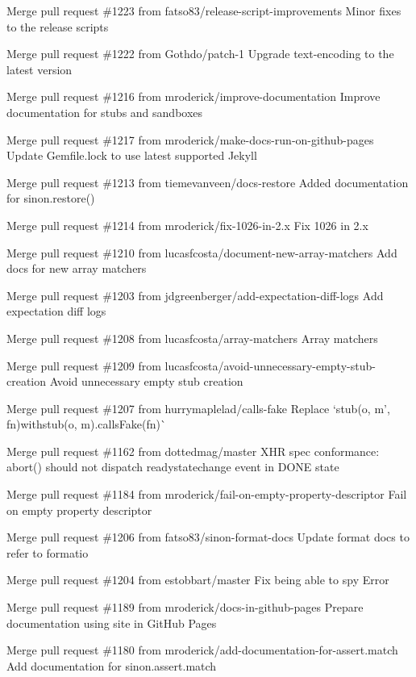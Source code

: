 \begin{DoxyItemize}
\item Merge pull request \#1223 from fatso83/release-\/script-\/improvements Minor fixes to the release scripts
\item Merge pull request \#1222 from Gothdo/patch-\/1 Upgrade text-\/encoding to the latest version
\item Merge pull request \#1216 from mroderick/improve-\/documentation Improve documentation for stubs and sandboxes
\item Merge pull request \#1217 from mroderick/make-\/docs-\/run-\/on-\/github-\/pages Update Gemfile.\+lock to use latest supported Jekyll
\item Merge pull request \#1213 from tiemevanveen/docs-\/restore Added documentation for sinon.\+restore()
\item Merge pull request \#1214 from mroderick/fix-\/1026-\/in-\/2.\+x Fix 1026 in 2.\+x
\item Merge pull request \#1210 from lucasfcosta/document-\/new-\/array-\/matchers Add docs for new array matchers
\item Merge pull request \#1203 from jdgreenberger/add-\/expectation-\/diff-\/logs Add expectation diff logs
\item Merge pull request \#1208 from lucasfcosta/array-\/matchers Array matchers
\item Merge pull request \#1209 from lucasfcosta/avoid-\/unnecessary-\/empty-\/stub-\/creation Avoid unnecessary empty stub creation
\item Merge pull request \#1207 from hurrymaplelad/calls-\/fake Replace `stub(o, \textquotesingle{}m', fn){\ttfamily with}stub(o, \textquotesingle{}m\textquotesingle{}).calls\+Fake(fn)\`{}
\item Merge pull request \#1162 from dottedmag/master X\+HR spec conformance\+: abort() should not dispatch readystatechange event in D\+O\+NE state
\item Merge pull request \#1184 from mroderick/fail-\/on-\/empty-\/property-\/descriptor Fail on empty property descriptor
\item Merge pull request \#1206 from fatso83/sinon-\/format-\/docs Update format docs to refer to formatio
\item Merge pull request \#1204 from estobbart/master Fix being able to spy Error
\item Merge pull request \#1189 from mroderick/docs-\/in-\/github-\/pages Prepare documentation using site in Git\+Hub Pages
\item Merge pull request \#1180 from mroderick/add-\/documentation-\/for-\/assert.\+match Add documentation for sinon.\+assert.\+match

\end{DoxyItemize}
